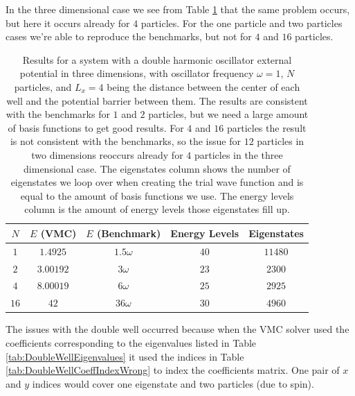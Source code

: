 \documentclass[../main.tex]{subfiles}
\begin{document}
In the three dimensional case we see from Table \ref{tab:DoubleHOTest3D} that the same problem occurs, but here it occurs already for $4$ particles. For the one particle and two particles cases we're able to reproduce the benchmarks, but not for $4$ and $16$ particles.

\begin{table}[!ht]
  \centering
  \begin{tabular}{ | c | c | c | c | c | }
    \hline
    $N$ & $E$ (VMC) & $E$ (Benchmark) &  Energy Levels & Eigenstates\\*
    \hline
    $1$ & $1.4925$ & $1.5\omega$ & $40$ & $11480$ \\*
    \hline
    $2$ & $3.00192$ & $3\omega$ & $23$ & $2300$ \\*
    \hline
    $4$ & $8.00019$ & $6\omega$ & $25$ & $2925$ \\*
    \hline
    $16$ & $42$ & $36\omega$ & $30$ & $4960$ \\*
    \hline
  \end{tabular}
  \caption{Results for a system with a double harmonic oscillator external potential in three dimensions, with oscillator frequency $\omega = 1$, $N$ particles, and $L_x = 4$ being the distance between the center of each well and the potential barrier between them. The results are consistent with the benchmarks for $1$ and $2$ particles, but we need a large amount of basis functions to get good results. For $4$ and $16$ particles the result is not consistent with the benchmarks, so the issue for $12$ particles in two dimensions reoccurs already for $4$ particles in the three dimensional case. The eigenstates column shows the number of eigenstates we loop over when creating the trial wave function and is equal to the amount of basis functions we use. The energy levels column is the amount of energy levels those eigenstates fill up.}
  \label{tab:DoubleHOTest3D}
\end{table}

The issues with the double well occurred because when the VMC solver used the coefficients corresponding to the eigenvalues listed in Table \ref{tab:DoubleWellEigenvalues} it used the indices in Table \ref{tab:DoubleWellCoeffIndexWrong} to index the coefficients matrix. One pair of $x$ and $y$ indices would cover one eigenstate and two particles (due to spin). 
\end{document}
